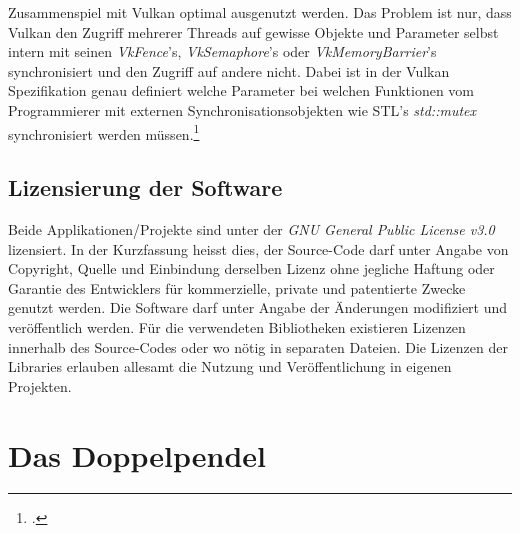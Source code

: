 \documentclass[titlepage, 11pt, a4paper, ngerman]{article}
\begin{document}
Zusammenspiel mit Vulkan optimal ausgenutzt werden. Das Problem ist nur, dass Vulkan den Zugriff mehrerer \glspl{Thread} auf gewisse Objekte und Parameter selbst intern mit seinen \textit{VkFence}'s, \textit{VkSemaphore}'s oder \textit{VkMemoryBarrier}'s synchronisiert und den Zugriff auf andere nicht. Dabei ist in der Vulkan Spezifikation genau definiert welche Parameter bei welchen Funktionen vom Programmierer mit externen Synchronisationsobjekten wie STL's \textit{std::mutex} synchronisiert werden müssen.\footcite{vkspec-multithreading}

\subsection{Lizensierung der Software}
Beide Applikationen/Projekte sind unter der \textit{GNU General Public License v3.0} lizensiert. In der Kurzfassung heisst dies, der Source-Code darf unter Angabe von Copyright, Quelle und Einbindung derselben Lizenz ohne jegliche Haftung oder Garantie des Entwicklers für kommerzielle, private und patentierte Zwecke genutzt werden. Die Software darf unter Angabe der Änderungen modifiziert und veröffentlich werden. Für die verwendeten Bibliotheken existieren Lizenzen innerhalb des Source-Codes oder wo nötig in separaten Dateien. Die Lizenzen der Libraries erlauben allesamt die Nutzung und Veröffentlichung in eigenen Projekten.


\newpage
\section{Das Doppelpendel}
\end{document}

